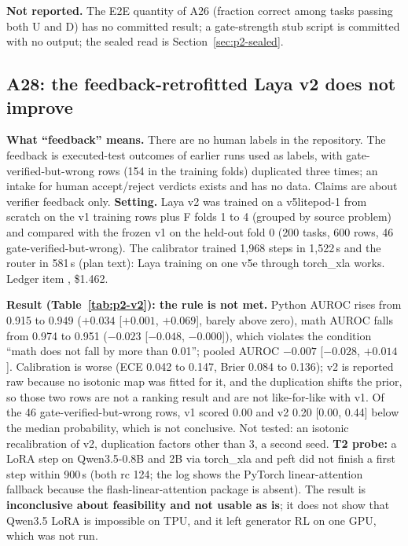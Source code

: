 \documentclass[11pt,a4paper]{article}
\newcommand{\code}[1]{\texttt{\detokenize{#1}}}
\begin{document}
\textbf{Not reported.} The E2E quantity of A26 (fraction correct among tasks passing both U and D) has no committed result; a gate-strength stub script is committed with no output; the sealed read is Section~\ref{sec:p2-sealed}.



\subsection{A28: the feedback-retrofitted Laya v2 does not improve}\label{sec:p2-v2}

\textbf{What ``feedback'' means.} There are no human labels in the repository. The feedback is executed-test outcomes of earlier runs used as labels, with gate-verified-but-wrong rows (154 in the training folds) duplicated three times; an intake for human accept/reject verdicts exists and has no data. Claims are about verifier feedback only. \textbf{Setting.} Laya v2 was trained on a v5litepod-1 from scratch on the v1 training rows plus F folds 1 to 4 (grouped by source problem) and compared with the frozen v1 on the held-out fold 0 (200 tasks, 600 rows, 46 gate-verified-but-wrong). The calibrator trained 1,968 steps in 1,522\,s and the router in 581\,s (plan text): Laya training on one v5e through torch\_xla works. Ledger item \code{tpu_laya-v2-200303}, \$1.462.

\textbf{Result (Table~\ref{tab:p2-v2}): the rule is not met.} Python AUROC rises from 0.915 to 0.949 ($+0.034$ [$+0.001$, $+0.069$], barely above zero), math AUROC falls from 0.974 to 0.951 ($-0.023$ [$-0.048$, $-0.000$]), which violates the condition ``math does not fall by more than 0.01''; pooled AUROC $-0.007$ [$-0.028$, $+0.014$]. Calibration is worse (ECE 0.042 to 0.147, Brier 0.084 to 0.136); v2 is reported raw because no isotonic map was fitted for it, and the duplication shifts the prior, so those two rows are not a ranking result and are not like-for-like with v1. Of the 46 gate-verified-but-wrong rows, v1 scored 0.00 and v2 0.20 [0.00, 0.44] below the median probability, which is not conclusive. Not tested: an isotonic recalibration of v2, duplication factors other than 3, a second seed. \textbf{T2 probe:} a LoRA step on Qwen3.5-0.8B and 2B via torch\_xla and peft did not finish a first step within 900\,s (both rc 124; the log shows the PyTorch linear-attention fallback because the flash-linear-attention package is absent). The result is \textbf{inconclusive about feasibility and not usable as is}; it does not show that Qwen3.5 LoRA is impossible on TPU, and it left generator RL on one GPU, which was not run.
\end{document}
